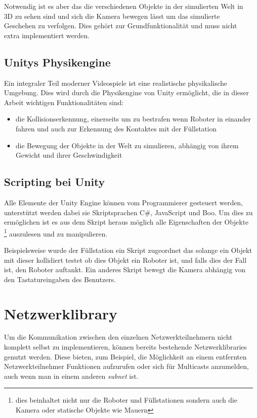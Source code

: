 \documentclass[
    12pt,
    bibliography=totoc,
    ngerman
]{scrartcl}
\begin{document}
Notwendig ist es aber das die verschiedenen Objekte in der simulierten Welt in 3D zu sehen sind und sich die Kamera bewegen l{\"{a}}sst um das simulierte Geschehen zu
verfolgen. Dies geh{\"{o}}rt zur Grundfunktionalit{\"{a}}t und muss nicht extra implementiert werden.

\subsection{Unitys Physikengine}
Ein integraler Teil moderner Videospiele ist eine realistische physikalische Umgebung. Dies wird durch die Physikengine von Unity erm{\"{o}}glicht, die in dieser Arbeit wichtigen Funktionalit{\"{a}}ten sind:

\begin{itemize}
\item die Kollisionserkennung, einerseits um zu bestrafen wenn Roboter in einander fahren und auch zur Erkennung des Kontaktes mit der F{\"{u}}llstation
\item die Bewegung der Objekte in der Welt zu simulieren, abh{\"{a}}ngig von ihrem Gewicht und ihrer Geschwindigkeit
\end{itemize}

\subsection{Scripting bei Unity}
Alle Elemente der Unity Engine k{\"{o}}nnen vom Programmierer gesteuert werden, unterst{\"{u}}tzt werden dabei sie Skriptsprachen C\#, JavaScript und Boo.\cite{wiki:unity} Um dies zu erm{\"{o}}glichen ist es aus dem Skript heraus m{\"{o}}glich alle Eigenschaften
der Objekte \footnote{dies beinhaltet nicht nur die Roboter und F{\"{u}}llstationen sondern auch die Kamera oder statische Objekte wie Mauern} auszulesen und zu manipulieren.

Beispielsweise wurde der F{\"{u}}llstation ein Skript zugeordnet das solange ein Objekt mit dieser kollidiert testet ob dies Objekt ein Roboter ist, und falls dies der Fall ist,
den Roboter auftankt. Ein anderes Skript bewegt die Kamera abh{\"{a}}ngig von den Tastatureingaben des Benutzers.

\clearpage
\section{Netzwerklibrary}
Um die Kommunikation zwischen den einzelnen Netzwerkteilnehmern nicht komplett selbst zu implementieren, k{\"{o}}nnen bereits bestehende Netzwerklibraries genutzt werden.
Diese bieten, zum Beispiel, die M{\"{o}}glichkeit an einem entfernten Netzwerkteilnehmer Funktionen aufzurufen oder sich f{\"{u}}r Multicasts anzumelden, auch wenn man in einem anderen
\textit{subnet} ist.
\end{document}

